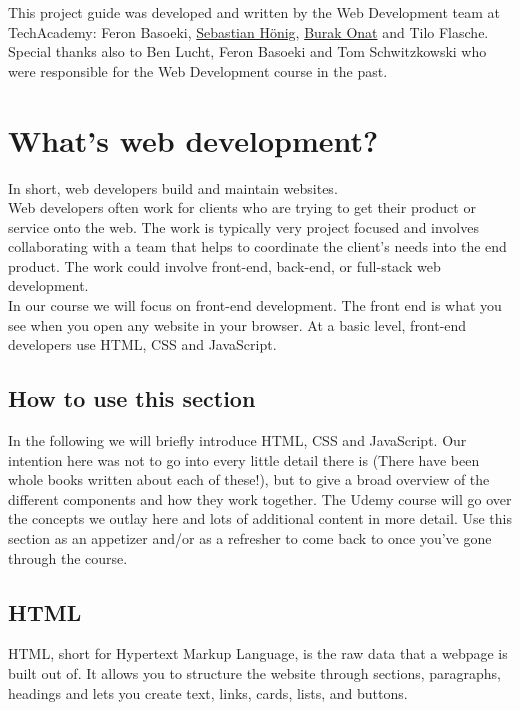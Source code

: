 \documentclass[
]{book}
\begin{document}
This project guide was developed and written by the Web Development team at TechAcademy: Feron Basoeki, \href{https://www.linkedin.com/in/sebastian-hönig/}{Sebastian Hönig}, \href{https://www.linkedin.com/in/tburakonat/}{Burak Onat} and Tilo Flasche. Special thanks also to Ben Lucht, Feron Basoeki and Tom Schwitzkowski who were responsible for the Web Development course in the past.

\hypertarget{whats-web-development}{%
\chapter{What's web development?}\label{whats-web-development}}

In short, web developers build and maintain websites.\\
Web developers often work for clients who are trying to get their product or service onto the web. The work is typically very project focused and involves collaborating with a team that helps to coordinate the client's needs into the end product. The work could involve front-end, back-end, or full-stack web development.\\
In our course we will focus on front-end development. The front end is what you see when you open any website in your browser. At a basic level, front-end developers use HTML, CSS and JavaScript.

\hypertarget{how-to-use-this-section}{%
\section{How to use this section}\label{how-to-use-this-section}}

In the following we will briefly introduce HTML, CSS and JavaScript. Our intention here was not to go into every little detail there is (There have been whole books written about each of these!), but to give a broad overview of the different components and how they work together. The Udemy course will go over the concepts we outlay here and lots of additional content in more detail. Use this section as an appetizer and/or as a refresher to come back to once you've gone through the course.

\hypertarget{html}{%
\section{HTML}\label{html}}

HTML, short for Hypertext Markup Language, is the raw data that a webpage is built out of. It allows you to structure the website through sections, paragraphs, headings and lets you create text, links, cards, lists, and buttons.
\end{document}
